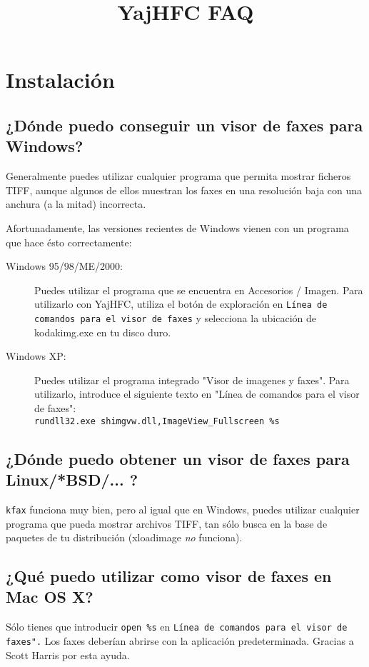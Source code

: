 \documentclass[a4paper,10pt]{scrartcl}
\title{YajHFC FAQ}
\author{}
\date{}
\begin{document}
\maketitle

\tableofcontents

\section{Instalación}
\subsection{¿Dónde puedo conseguir un visor de faxes para Windows?}

Generalmente puedes utilizar cualquier programa que permita mostrar ficheros TIFF, aunque algunos de ellos muestran los faxes en una resolución baja con una anchura (a la mitad) incorrecta.

Afortunadamente, las versiones recientes de Windows vienen con un programa 
que hace ésto correctamente:

\begin{description}
\item[Windows 95/98/ME/2000:]
Puedes utilizar el programa que se encuentra en Accesorios / Imagen. 
Para utilizarlo con YajHFC, utiliza el botón de exploración en \texttt{Línea de comandos 
para el visor de faxes} y selecciona la ubicación de kodakimg.exe en tu disco duro.

\item[Windows XP:]
Puedes utilizar el programa integrado "Visor de imagenes y faxes". 
Para utilizarlo, introduce el siguiente texto en "Línea de comandos para el visor de faxes":\\
      \verb#rundll32.exe shimgvw.dll,ImageView_Fullscreen %s#
 \end{description}

      
\subsection{¿Dónde puedo obtener un visor de faxes para Linux/*BSD/... ?}
\texttt{kfax} funciona muy bien, pero al igual que en Windows, puedes utilizar cualquier programa que pueda mostrar archivos TIFF, tan sólo busca en la base de paquetes de tu distribución (xloadimage \emph{no} funciona).


\subsection{¿Qué puedo utilizar como visor de faxes en Mac OS X?}
Sólo tienes que introducir \verb#open %s# en \texttt{Línea de comandos para el visor de faxes".}
Los faxes deberían abrirse con la aplicación predeterminada. 
Gracias a Scott Harris por esta ayuda.
\end{document}
